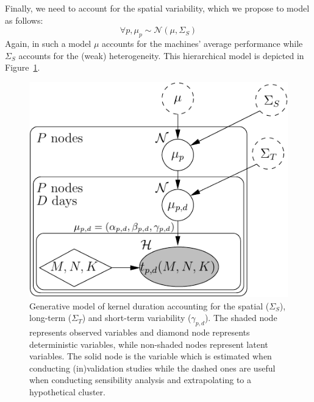             Finally, we need to account for the spatial variability, which we propose to model as follows:
            \begin{equation}
                \label{eq:dgemm.spatial}
                \forall p, \mu_{p} \sim \mathcal{N}(\mu,\Sigma_S)
            \end{equation}
            Again, in such a model \(\mu\) accounts for the machines' average performance while \(\Sigma_S\) accounts
            for the (weak) heterogeneity. This hierarchical model is depicted in Figure~\ref{fig:model:generative}.
            \begin{figure}[tpb]
                \centering
                \includegraphics[width=0.6\linewidth]{img/prediction/modeling/kernels//generative_model.pdf}

                \caption{Generative model of kernel duration accounting for the
                  spatial ($\Sigma_S$), long-term ($\Sigma_T$) and short-term variability ($\gamma_{p,d}$). The shaded node
                  represents observed variables and diamond node represents
                  deterministic variables, while non-shaded nodes represent latent
                  variables. The solid node is the variable which is estimated
                  when conducting (in)validation studies while the dashed ones are
                  useful when conducting sensibility analysis and extrapolating to
                  a hypothetical cluster.}
                \label{fig:model:generative}
            \end{figure}

